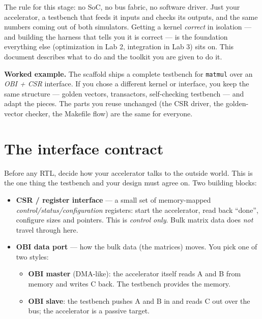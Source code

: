 \documentclass[11pt]{article}
\newcommand{\code}[1]{\texttt{#1}}
\begin{document}
The rule for this stage: no SoC, no bus fabric, no software driver. Just your
accelerator, a testbench that feeds it inputs and checks its outputs, and the
same numbers coming out of both simulators. Getting a kernel \emph{correct} in
isolation --- and building the harness that tells you it is correct --- is the
foundation everything else (optimization in Lab 2, integration in Lab 3) sits
on. This document describes what to do and the toolkit you are given to do it.

\medskip
\noindent\textbf{Worked example.} The scaffold ships a complete testbench for
\code{matmul} over an \emph{OBI + CSR} interface. If you chose a different
kernel or interface, you keep the same structure --- golden vectors, transactors,
self-checking testbench --- and adapt the pieces. The parts you reuse unchanged
(the CSR driver, the golden-vector checker, the Makefile flow) are the same for
everyone.

\section{The interface contract}

Before any RTL, decide how your accelerator talks to the outside world. This is
the one thing the testbench and your design must agree on. Two building blocks:

\begin{itemize}[nosep]
  \item \textbf{CSR / register interface} --- a small set of memory-mapped
        \emph{control/status/configuration} registers: start the accelerator,
        read back ``done'', configure sizes and pointers. This is
        \emph{control only}. Bulk matrix data does \emph{not} travel through
        here.
  \item \textbf{OBI data port} --- how the bulk data (the matrices) moves. You
        pick one of two styles:
        \begin{itemize}[nosep]
          \item \textbf{OBI master} (DMA-like): the accelerator itself reads A
                and B from memory and writes C back. The testbench provides the
                memory.
          \item \textbf{OBI slave}: the testbench pushes A and B in and reads C
                out over the bus; the accelerator is a passive target.
        \end{itemize}
\end{itemize}
\end{document}
